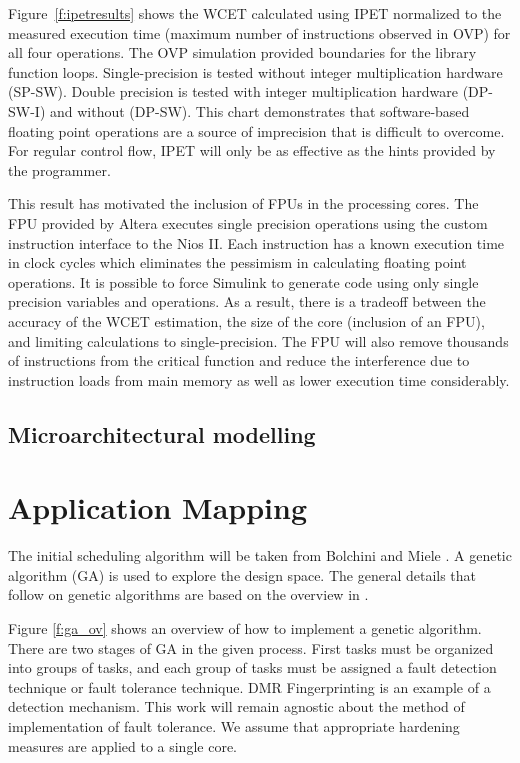 \documentclass[table,11pt]{article}
\begin{document}
Figure~\ref{f:ipetresults} shows the WCET calculated using IPET normalized to the measured execution time (maximum number of instructions observed in OVP) for all four operations. The OVP simulation provided boundaries for the library function loops. Single-precision is tested without integer multiplication hardware (SP-SW). Double precision is tested with integer multiplication hardware (DP-SW-I) and without (DP-SW). This chart demonstrates that software-based floating point operations are a source of imprecision that is difficult to overcome. 
For regular control flow, IPET will only be as effective as the hints provided by the programmer.

This result has motivated the inclusion of FPUs in the processing cores. The FPU provided by Altera executes single precision operations using the custom instruction interface to the Nios II. Each instruction has a known execution time in clock cycles which eliminates the pessimism in calculating floating point operations. It is possible to force Simulink to generate code using only single precision variables and operations. As a result, there is a tradeoff between the accuracy of the WCET estimation, the size of the core (inclusion of an FPU), and limiting calculations to single-precision. The FPU will also remove thousands of instructions from the critical function and reduce the interference due to instruction loads from main memory as well as lower execution time considerably.

\subsection{Microarchitectural modelling}

 
\section{Application Mapping}

The initial scheduling algorithm will be taken from Bolchini and  Miele \cite{bolchini2013reliability}. A genetic algorithm (GA) is used to explore the design space. The general details that follow on genetic algorithms are based on the overview in \cite{geatbx}.

Figure \ref{f:ga_ov} shows an overview of how to implement a genetic algorithm. There are two stages of GA in the given process. First tasks must be organized into groups of tasks, and each group of tasks must be assigned a fault detection technique or fault tolerance technique. DMR Fingerprinting is an example of a detection mechanism. This work will remain agnostic about the method of implementation of fault tolerance. We assume that appropriate hardening measures are applied to a single core.
 
\end{document}

